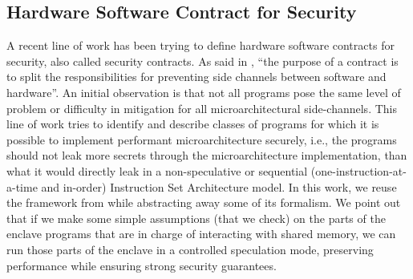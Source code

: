 \subsection{Hardware Software Contract for Security}
\label{sec:hwswcontract}
A recent line of work \cite{guarnieri2021hardware, mosier2022axiomatic} has been trying to define hardware software contracts for security, also called security contracts.
As said in \cite{guarnieri2021hardware}, ``the purpose of a contract is to split the responsibilities for preventing side channels between software and hardware''.
An initial observation is that not all programs pose the same level of problem or difficulty in mitigation for all microarchitectural side-channels. 
This line of work tries to identify and describe classes of programs for which it is possible to implement performant microarchitecture securely, i.e., the programs should not leak more secrets through the microarchitecture implementation, than what it would directly leak in a non-speculative or sequential (one-instruction-at-a-time and in-order) Instruction Set Architecture model.
In this work, we reuse the framework from \cite{guarnieri2021hardware} while abstracting away some of its formalism. 
We point out that if we make some simple assumptions (that we check) on the parts of the enclave programs that are in charge of interacting with shared memory, we can run those parts of the enclave in a controlled speculation mode, preserving performance while ensuring strong security guarantees. 